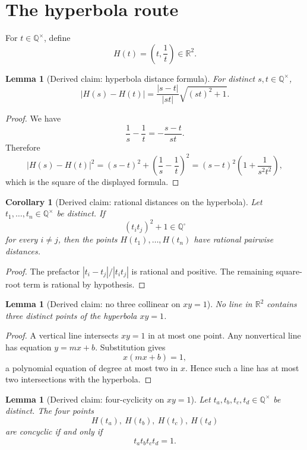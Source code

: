 \documentclass[11pt]{article}
\newtheorem{lemma}[theorem]{Lemma}
\newtheorem{corollary}[theorem]{Corollary}
\theoremstyle{definition}
\theoremstyle{remark}
\newcommand{\Q}{\mathbb{Q}}
\newcommand{\R}{\mathbb{R}}
\newcommand{\Qs}{\Q^{\square}}
\newcommand{\abs}[1]{\left|#1\right|}
\begin{document}
\section{The hyperbola route}

For \(t\in\Q^\times\), define
\[
H(t)=\left(t,\frac1t\right)\in\R^2.
\]

\begin{lemma}[Derived claim: hyperbola distance formula]
For distinct \(s,t\in\Q^\times\),
\[
\abs{H(s)-H(t)}
=
\frac{\abs{s-t}}{\abs{st}}\sqrt{{(st)}^2+1}.
\]
\end{lemma}

\begin{proof}
We have
\[
\frac1s-\frac1t=-\frac{s-t}{st}.
\]
Therefore
\[
\abs{H(s)-H(t)}^2
={(s-t)}^2+{\left(\frac1s-\frac1t\right)}^2
={(s-t)}^2\left(1+\frac1{s^2t^2}\right),
\]
which is the square of the displayed formula.
\end{proof}

\begin{corollary}[Derived claim: rational distances on the hyperbola]
Let \(t_1,
\ldots,t_n\in\Q^\times\) be distinct.  If
\[
{(t_i t_j)}^2+1\in\Qs
\]
for every \(i\ne j\), then the points \(H(t_1),\ldots,H(t_n)\) have rational
pairwise distances.
\end{corollary}

\begin{proof}
The prefactor \(\abs{t_i-t_j}/\abs{t_i t_j}\) is rational and positive.  The
remaining square-root term is rational by hypothesis.
\end{proof}

\begin{lemma}[Derived claim: no three collinear on \(xy=1\)]
No line in \(\R^2\) contains three distinct points of the hyperbola \(xy=1\).
\end{lemma}

\begin{proof}
A vertical line intersects \(xy=1\) in at most one point.  Any nonvertical line
has equation \(y=mx+b\).  Substitution gives
\[
x(mx+b)=1,
\]
a polynomial equation of degree at most two in \(x\).  Hence such a line has at
most two intersections with the hyperbola.
\end{proof}

\begin{lemma}[Derived claim: four-cyclicity on \(xy=1\)]\label{lem:hyperbola-cyclic}
Let \(t_a,t_b,t_c,t_d\in\Q^\times\) be distinct.  The four points
\[
H(t_a),\ H(t_b),\ H(t_c),\ H(t_d)
\]
are concyclic if and only if
\[
t_a t_b t_c t_d=1.
\]
\end{lemma}
\end{document}
